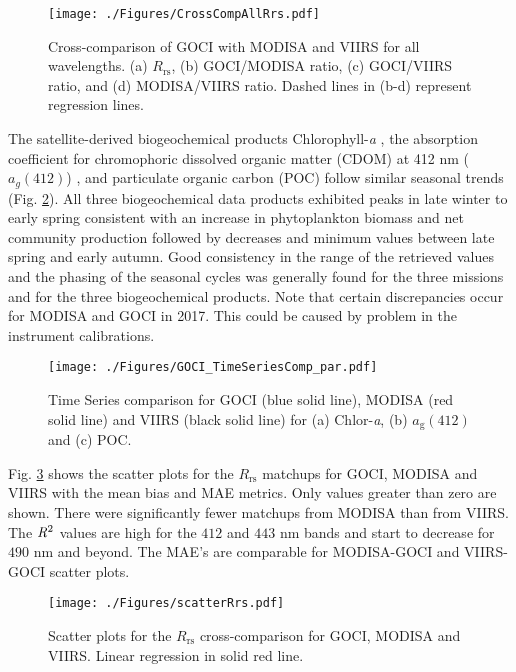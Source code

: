 \documentclass[]{interact}
\theoremstyle{plain}%
\theoremstyle{definition}
\theoremstyle{remark}
\providecommand{\DIFaddbeginFL}{} %
\providecommand{\DIFaddendFL}{} %
\providecommand{\DIFdelbeginFL}{} %
\providecommand{\DIFdelendFL}{} %
\newcommand{\DIFscaledelfig}{0.5}
\newlength{\DIFdelgraphicswidth} %
\newlength{\DIFdelgraphicsheight} %
\newcommand{\DIFaddincludegraphics}[2][]{{\color{blue}\fbox{\DIFOincludegraphics[#1]{#2}}}} %
\newcommand{\DIFdelincludegraphics}[2][]{%
\sbox{\DIFdelgraphicsbox}{\DIFOincludegraphics[#1]{#2}}%
\settoboxwidth{\DIFdelgraphicswidth}{\DIFdelgraphicsbox} %
\settoboxtotalheight{\DIFdelgraphicsheight}{\DIFdelgraphicsbox} %
\scalebox{\DIFscaledelfig}{%
\parbox[b]{\DIFdelgraphicswidth}{\usebox{\DIFdelgraphicsbox}\\[-\baselineskip] \rule{\DIFdelgraphicswidth}{0em}}\llap{\resizebox{\DIFdelgraphicswidth}{\DIFdelgraphicsheight}{%
\setlength{\unitlength}{\DIFdelgraphicswidth}%
\begin{picture}(1,1)%
\thicklines\linethickness{2pt} %
{\color[rgb]{1,0,0}\put(0,0){\framebox(1,1){}}}%
{\color[rgb]{1,0,0}\put(0,0){\line( 1,1){1}}}%
{\color[rgb]{1,0,0}\put(0,1){\line(1,-1){1}}}%
\end{picture}%
}\hspace*{3pt}}} %
} %
\DeclareRobustCommand{\DIFaddbeginFL}{\DIFOaddbeginFL \let\includegraphics\DIFaddincludegraphics} %
\DeclareRobustCommand{\DIFaddendFL}{\DIFOaddendFL \let\includegraphics\DIFOincludegraphics} %
\DeclareRobustCommand{\DIFdelbeginFL}{\DIFOdelbeginFL \let\includegraphics\DIFdelincludegraphics} %
\DeclareRobustCommand{\DIFdelendFL}{\DIFOaddendFL \let\includegraphics\DIFOincludegraphics} %
\begin{document}
\begin{figure}[H]
  \centering
  \texttt{[image: ./Figures/CrossCompAllRrs.pdf]}
    \caption{Cross-comparison of GOCI with MODISA and VIIRS for all wavelengths. (a) $R_\text{rs}$, (b) GOCI/MODISA ratio, (c) GOCI/VIIRS ratio, and (d) MODISA/VIIRS ratio. Dashed lines in (b-d) represent regression lines. \label{fig:CrossCompAllRrs} } 
\end{figure}
The satellite-derived biogeochemical products Chlorophyll-{\it a} \citep{OReilly1998_Chl}, the absorption coefficient for chromophoric dissolved organic matter (CDOM) at 412 nm  ($a_g(412)$) \citep{Mannino2014}, and particulate organic carbon (POC) \citep{Stramski2008} follow similar seasonal trends (Fig. \ref{fig:GOCI_TimeSeriesComp_par}). All three biogeochemical data products exhibited peaks in late winter to early spring consistent with an increase in phytoplankton biomass and net community production followed by decreases and minimum values between late spring and early autumn. Good consistency in the range of the retrieved values and the phasing of the seasonal cycles was generally found for the three missions and for the three biogeochemical products. Note that certain discrepancies occur for MODISA and GOCI in 2017. This could be caused by problem in the instrument calibrations.


\begin{figure}[H]
  \centering
  \texttt{[image: ./Figures/GOCI\_TimeSeriesComp\_par.pdf]}
    \caption{Time Series comparison for GOCI (blue solid line), MODISA (red solid line) and VIIRS (black solid line) for (a) Chlor-{\it a}, (b) $a_\text{g}(412)$ and (c) POC. \label{fig:GOCI_TimeSeriesComp_par}} 
\end{figure}
Fig. \ref{fig:scatterRrs} shows the scatter plots for the $R_\text{rs}$ matchups for GOCI, MODISA and VIIRS with the mean bias and MAE metrics. Only values greater than zero are shown. There were significantly fewer matchups from MODISA than from VIIRS. The ${\it R}^2$ values are high for the $412$ and $443$ nm bands and start to decrease for $490$ nm and beyond. The MAE's are comparable for MODISA-GOCI and VIIRS-GOCI scatter plots.
\begin{figure}[H]
  \centering
  \DIFdelbeginFL %
\DIFdelendFL \DIFaddbeginFL \texttt{[image: ./Figures/scatterRrs.pdf]}
    \DIFaddendFL %
    \caption{Scatter plots for the $R_\text{rs}$ cross-comparison for GOCI, MODISA and VIIRS. Linear regression in solid red line. \label{fig:scatterRrs}} 
\end{figure}
\end{document}
